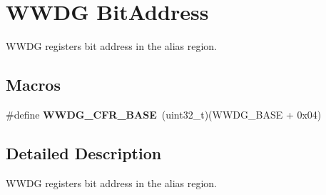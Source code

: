 \hypertarget{group___w_w_d_g___bit_address___alias_region}{}\section{W\+W\+DG Bit\+Address}
\label{group___w_w_d_g___bit_address___alias_region}


W\+W\+DG registers bit address in the alias region.  


\subsection*{Macros}
\begin{DoxyCompactItemize}
\item 
\#define {\bfseries W\+W\+D\+G\+\_\+\+C\+F\+R\+\_\+\+B\+A\+SE}~(uint32\+\_\+t)(W\+W\+D\+G\+\_\+\+B\+A\+SE + 0x04)\hypertarget{group___w_w_d_g___bit_address___alias_region_ga971d9a94fe4348c9a12fe03de7c0e781}{}\label{group___w_w_d_g___bit_address___alias_region_ga971d9a94fe4348c9a12fe03de7c0e781}

\end{DoxyCompactItemize}


\subsection{Detailed Description}
W\+W\+DG registers bit address in the alias region. 

